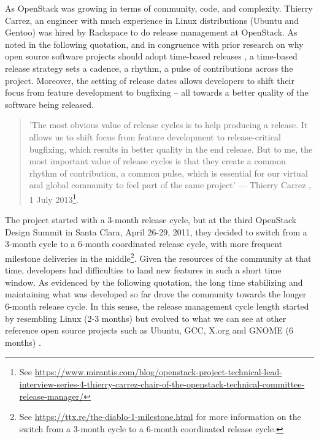 As OpenStack was growing in terms of community, code, and complexity.  Thierry Carrez, an engineer with much experience in  Linux distributions (Ubuntu and Gentoo) was hired by Rackspace to do release management at OpenStack. As noted in the following quotation, and in congruence with prior research on why open source software projects should adopt time-based releases \cite{michlmayr2015and}, a time-based release strategy sets a cadence, a rhythm, a pulse of contributions across the project. Moreover, the setting of release dates allows developers to shift their focus from feature development to bugfixing -- all towards a better quality of the software being released. 


\begin{quotation}
\footnotesize
'The most obvious value of release cycles is to help producing a release. It allows us to shift focus from feature development to release-critical bugfixing, which results in better quality in the end release. But to me, the most important value of release cycles is that they create a common rhythm of contribution, a common pulse, which is essential for our virtual and global community to feel part of the same project' --- Thierry Carrez , 1 July 2013\footnote{See \url{https://www.mirantis.com/blog/openstack-project-technical-lead-interview-series-4-thierry-carrez-chair-of-the-openstack-technical-committee-release-manager/}}. 
\end{quotation}



The project started with a 3-month release cycle, but at the third OpenStack Design Summit in Santa Clara, April 26-29, 2011, they decided to switch from a 3-month cycle to a 6-month coordinated release cycle, with more frequent milestone deliveries in the middle\footnote{See \url{ https://ttx.re/the-diablo-1-milestone.html} for more information on the switch from a 3-month cycle to a 6-month coordinated release cycle.}. Given the resources of the community at that time, developers had difficulties to land new features in such a short time window. As evidenced by the following quotation, the long time stabilizing and maintaining what was developed so far drove the community towards the longer 6-month release cycle. In this sense, the release management cycle length started by resembling Linux (2-3 months) but evolved to what we can see at other reference open source projects such as Ubuntu, GCC, X.org and GNOME (6 months) \cite{michlmayr2015and}.

